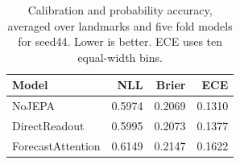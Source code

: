 \begin{table}[t]
\centering
\caption{Calibration and probability accuracy, averaged over landmarks and five fold models for seed44. Lower is better. ECE uses ten equal-width bins.}
\label{tab:calibration}
\begin{tabular}{lrrr}
\toprule
Model & NLL & Brier & ECE \\
\midrule
NoJEPA & 0.5974 & 0.2069 & 0.1310 \\
DirectReadout & 0.5995 & 0.2073 & 0.1377 \\
ForecastAttention & 0.6149 & 0.2147 & 0.1622 \\
\bottomrule
\end{tabular}
\end{table}

